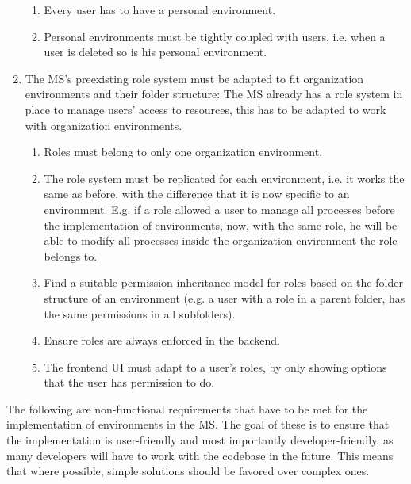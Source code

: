 \begin{enumerate}
\begin{enumerate}
		      \item Every user has to have a personal environment.

		      \item Personal environments must be tightly coupled with users, i.e. when a user is
		            deleted so is his personal environment.
	      \end{enumerate}


	\item The MS's preexisting role system must be adapted to fit organization environments
	      and their folder structure:
	      The MS already has a role system in place to manage users' access to resources,
	      this has to be adapted to work with organization environments.
	      \begin{enumerate}
		      \item Roles must belong to only one organization environment.
		      \item The role system must be replicated for each environment, i.e. it works the
		            same as before, with the difference that it is now specific to an environment.
		            E.g. if a role allowed a user to manage all processes before the implementation of
		            environments, now, with the same role, he will be able to modify all processes
		            inside the organization environment the role belongs to.
		      \item Find a suitable permission inheritance model for roles based on the folder
		            structure of an environment (e.g. a user with a role in a parent
		            folder, has the same permissions in all subfolders).
		      \item Ensure roles are always enforced in the backend.
		      \item The frontend UI must adapt to a user's roles, by only showing options that the user has permission to do.
	      \end{enumerate}
\end{enumerate}

The following are non-functional requirements that have to be met for the implementation
of environments in the MS.
The goal of these is to ensure that the implementation is user-friendly and most
importantly developer-friendly, as many developers will have to work with the codebase in
the future.
This means that where possible, simple solutions should be favored over complex ones.

